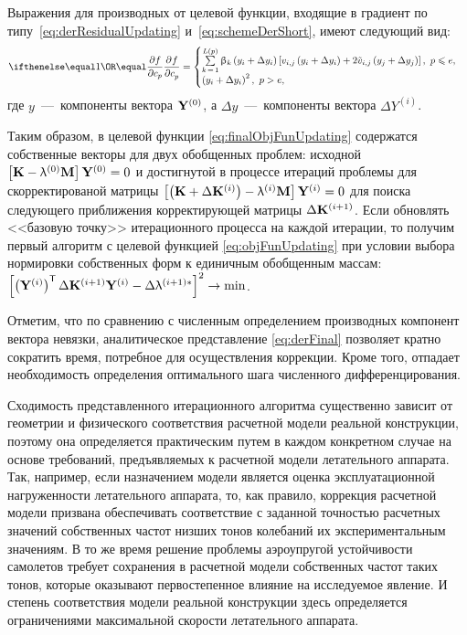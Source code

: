 Выражения для производных от целевой функции, входящие в градиент по типу~\eqref{eq:derResidualUpdating} и~\eqref{eq:schemeDerShort}, имеют следующий вид:
\begin{equation}
	\partDer{f}{c_p}{} = 
	\begin{cases}
		\sum\limits_{k\,=\,1} ^ {L(p)} \beta_k \rbrackets{y_i + \Delta y_i} \sbrackets{v_{i, j} \rbrackets{y_i + \Delta y_i} + 2 \tilde{v}_{i, j} \rbrackets{y_j + \Delta y_j}}, \ p \leq e, \\
		\rbrackets{y_i + \Delta y_i} ^ 2, \ p > e,
	\end{cases} \label{eq:derFinal}
\end{equation}
где $ y $~---~компоненты вектора $ \mathbf{Y} ^ {(0)} $, а $ \Delta y $~---~компоненты вектора $ \Delta Y ^ {(i)} $.

Таким образом, в целевой функции \eqref{eq:finalObjFunUpdating} содержатся собственные векторы для двух обобщенных проблем: исходной $ \left[ \mathbf{K} - \uplambda ^ {(0)} \mathbf{M} \right] \mathbf{Y} ^ {(0)} = 0 $ и достигнутой в процессе итераций проблемы для скорректированой матрицы $ \left[ \left( \mathbf{K} + \Delta \mathbf{K} ^ {(i)} \right) - \uplambda ^ {(i)} \mathbf{M} \right] \mathbf{Y} ^ {(i)} = 0 $ для поиска следующего приближения корректирующей матрицы $ \Delta \mathbf{K} ^ {(i + 1)} $. Если обновлять <<базовую точку>> итерационного процесса на каждой итерации, то получим первый алгоритм с целевой функцией \eqref{eq:objFunUpdating} при условии выбора нормировки собственных форм к единичным обобщенным массам: $ \left[ \left( \mathbf{Y} ^ {(i)} \right) ^ \mathsf{T} \Delta \mathbf{K} ^ {(i + 1)} \mathbf{Y} ^ {(i)} - \Delta \uplambda ^ {(i + 1) \ast} \right] ^ 2 \rightarrow \min $.

Отметим, что по сравнению с численным определением производных компонент вектора невязки, аналитическое представление \eqref{eq:derFinal} позволяет кратно сократить время, потребное для осуществления коррекции. Кроме того, отпадает необходимость определения оптимального шага численного дифференцирования.

Сходимость представленного итерационного алгоритма существенно зависит от геометрии и физического соответствия расчетной модели реальной конструкции, поэтому она определяется практическим путем в каждом конкретном случае на основе требований, предъявляемых к расчетной модели летательного аппарата. Так, например, если назначением модели является оценка эксплуатационной нагруженности летательного аппарата, то, как правило, коррекция расчетной модели призвана обеспечивать соответствие с заданной точностью расчетных значений собственных частот низших тонов колебаний их экспериментальным значениям. В то же время решение проблемы аэроупругой устойчивости самолетов требует сохранения в расчетной модели собственных частот таких тонов, которые оказывают первостепенное влияние на исследуемое явление. И степень соответствия модели реальной конструкции здесь определяется ограничениями максимальной скорости летательного аппарата.

